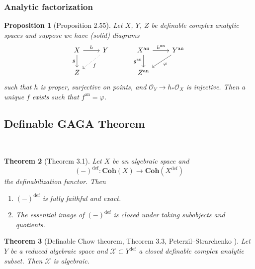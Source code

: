 \documentclass{amsart}
\newtheorem{theorem}{Theorem}[subsection]
\newtheorem{proposition}[theorem]{Proposition}
\theoremstyle{definition}
\numberwithin{equation}{section}
\newcommand{\definable}{\mathrm{def}}
\newcommand{\analytic}{\mathrm{an}}
\begin{document}
\subsubsection{Analytic factorization}
\begin{proposition}[Proposition 2.55] \label{analytic factorization}
	Let $X$, $Y$, $Z$ be definable complex analytic spaces and
	suppose we have (solid) diagrams
	\[
		\begin{tikzcd}
			X \ar[r,"h"] \ar[d,"g"'] & Y\ar[dl,"f",dotted] \\ Z
		\end{tikzcd}
		\hspace*{30pt}
		\begin{tikzcd}
			X^{\analytic} \ar[r,"h^{\analytic}"] \ar[d,"g^{\analytic}"'] & Y^{\analytic}\ar[dl,"\varphi"] \\ Z^{\analytic}
		\end{tikzcd}
	\]
	such that $h$ is proper, surjective on points,
	and $\mathcal{O}_Y \to h_*\mathcal{O}_X$ is injective.
	Then a unique $f$ exists such that $f^{\analytic} = \varphi$.
\end{proposition}

\subsection{Definable GAGA Theorem}~
\begin{tcolorbox}[title = {\Large Goal}]
	\begin{theorem}[Theorem 3.1]
		\label{def GAGA}
		Let $X$ be an algebraic space and
		\[(-)^{\definable} : \mathbf{Coh}(X) \to \mathbf{Coh}(X^{\definable})\]
		the definabilization functor.
		Then
		\begin{enumerate}[label = {(\arabic*)}]
			\item $(-)^{\definable}$ is fully faithful and exact.
			\item The essential image of $(-)^{\definable}$ is closed under taking subobjects and quotients.
		\end{enumerate}
	\end{theorem}
\end{tcolorbox}

\begin{theorem}[{Definable Chow theorem, Theorem 3.3, Peterzil--Strarchenko \cite[Corollary 4.5]{zbMATH05364146}}]
	Let $Y$ be a reduced algebraic space and
	$\mathcal{X} \subset Y^{\definable}$ a closed definable complex analytic subset.
	Then $\mathcal{X}$ is algebraic.
\end{theorem}
\end{document}
